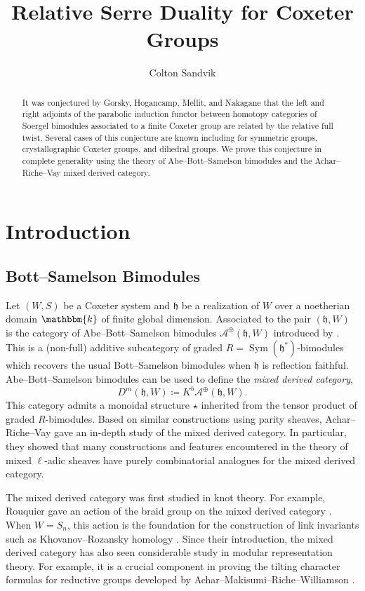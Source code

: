 \documentclass{amsart}
\title{Relative Serre Duality for Coxeter Groups}
\author{Colton Sandvik}
\date{}
\renewcommand{\k}{\mathbbm{k}}
\newcommand{\scrA}{\mathcal{A}}
\newcommand{\BE}{D^m}
\newcommand{\fr}[1]{\mathfrak{#1}}
\DeclareMathOperator{\Sym}{Sym}
\theoremstyle{definition}
\begin{document}
        \begin{abstract}
                It was conjectured by Gorsky, Hogancamp, Mellit, and Nakagane that the left and right adjoints of the parabolic induction functor between homotopy categories of Soergel bimodules associated to a finite Coxeter group are related by the relative full twist.
                Several cases of this conjecture are known including for symmetric groups, crystallographic Coxeter groups, and dihedral groups.
                We prove this conjecture in complete generality using the theory of Abe--Bott--Samelson bimodules and the Achar--Riche--Vay mixed derived category. 
        \end{abstract}

        \maketitle

        \section{Introduction}

        \subsection{Bott--Samelson Bimodules}

        Let $(W,S)$ be a Coxeter system and $\fr{h}$ be a realization of $W$ over a noetherian domain $\k$ of finite global dimension.
        Associated to the pair $(\fr{h}, W)$ is the category of Abe--Bott--Samelson bimodules $\scrA^{\oplus} (\fr{h}, W)$ introduced by \cite{Abe19}.
        This is a (non-full) additive subcategory of graded $R = \Sym (\fr{h}^*)$-bimodules which recovers the usual Bott--Samelson bimodules when $\fr{h}$ is reflection faithful.
        Abe--Bott--Samelson bimodules can be used to define the \emph{mixed derived category},
        \[\BE (\fr{h}, W) \coloneq K^b \scrA^{\oplus} (\fr{h}, W).\]
        This category admits a monoidal structure $\star$ inherited from the tensor product of graded $R$-bimodules.
        Based on similar constructions using parity sheaves, Achar--Riche--Vay \cite{ARV} gave an in-depth study of the mixed derived category.
        In particular, they showed that many constructions and features encountered in the theory of mixed $\ell$-adic sheaves have purely combinatorial analogues for the mixed derived category.
        
        The mixed derived category was first studied in knot theory. For example, Rouquier gave an action of the braid group on the mixed derived category \cite{Rou}.
        When $W= S_n$, this action is the foundation for the construction of link invariants such as  Khovanov--Rozansky homology  \cite{Kho, KR}.
        Since their introduction, the mixed derived category has also seen considerable study in modular representation theory.
        For example, it is a crucial component in proving the tilting character formulas for reductive groups developed by Achar--Makisumi--Riche--Williamson \cite{AMRW}.
\end{document}
